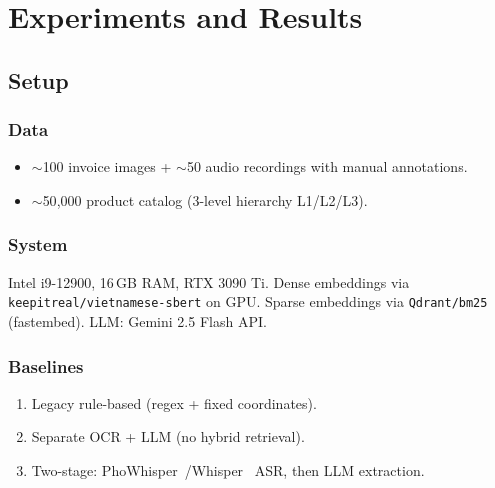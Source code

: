 \section{Experiments and Results}
\label{sec:experiments}

\subsection{Setup}

\subsubsection{Data}
\begin{itemize}
    \item $\sim$100 invoice images + $\sim$50 audio recordings with manual annotations.
    \item $\sim$50{,}000 product catalog (3-level hierarchy L1/L2/L3).
\end{itemize}

\subsubsection{System}
Intel i9-12900, 16\,GB RAM, RTX 3090 Ti. Dense embeddings via \texttt{keepitreal/vietnamese-sbert} on GPU. Sparse embeddings via \texttt{Qdrant/bm25} (fastembed). LLM: Gemini 2.5 Flash API.

\subsubsection{Baselines}
\begin{enumerate}
    \item Legacy rule-based (regex + fixed coordinates).
    \item Separate OCR + LLM (no hybrid retrieval).
    \item Two-stage: PhoWhisper~\cite{le2024phowhisper}/Whisper~\cite{radford2023whisper} ASR, then LLM extraction.
\end{enumerate}


